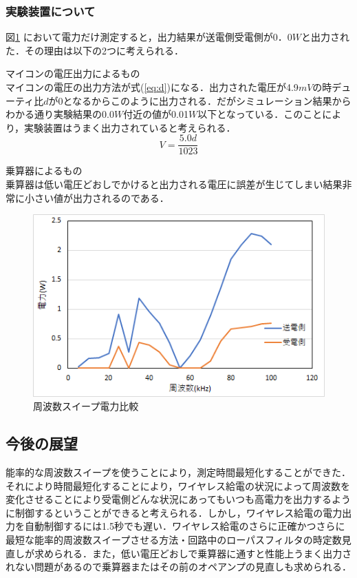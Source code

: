 \documentclass[12pt]{jarticle}
\begin{document}
\subsubsection*{実験装置について}
図\ref{fig:dennryoku} において電力だけ測定すると，出力結果が送電側受電側が0．0$W$と出力された．その理由は以下の2つに考えられる．
\begin{description}
	\item マイコンの電圧出力によるもの\mbox{}\\
マイコンの電圧の出力方法が式(\ref{eq:d})になる．出力された電圧が4.9$mV$の時デューティ比$d$が0となるからこのように出力される．だがシミュレーション結果からわかる通り実験結果の0.0$W$付近の値が0.01$W$以下となっている．このことにより，実験装置はうまく出力されていると考えられる．
\begin{equation}
\label{eq:d}
V=\frac{5.0d}{1023}
\end{equation}
	\item 乗算器によるもの \mbox{}\\
乗算器は低い電圧どおしでかけると出力される電圧に誤差が生じてしまい結果非常に小さい値が出力されるのである．
\end{description}

\begin{figure}[H]
	\centering
	\includegraphics[]{電力比較.png}
	\caption{周波数スイープ電力比較}
	\label{fig:dennryoku}
\end{figure}


\subsection{今後の展望}
能率的な周波数スイープを使うことにより，測定時間最短化することができた．それにより時間最短化することにより，ワイヤレス給電の状況によって周波数を変化させることにより受電側どんな状況にあってもいつも高電力を出力するように制御するということができると考えられる．しかし，ワイヤレス給電の電力出力を自動制御するには1.5秒でも遅い．ワイヤレス給電のさらに正確かつさらに最短な能率的周波数スイープさせる方法・回路中のローパスフィルタの時定数見直しが求められる．また，低い電圧どおしで乗算器に通すと性能上うまく出力されない問題があるので乗算器またはその前のオペアンプの見直しも求められる．
\clearpage
\end{document}
